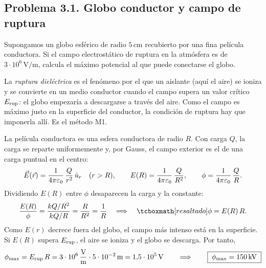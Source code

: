 \subsection{Problema 3.1. Globo conductor y campo de ruptura}\label{sem:globo}
\begin{problema}\label{prob:globo}
Supongamos un globo esférico de radio $5\,\mathrm{cm}$ recubierto por una fina película conductora. Si el campo electrostático de ruptura en la atmósfera
es de $3\cdot10^{6}\,\mathrm{V/m}$, calcula el máximo potencial al que puede conectarse el globo.
\end{problema}

\begin{resolucion}
 La \emph{ruptura dieléctrica} es el fenómeno por el que un aislante (aquí el aire) se ioniza y se convierte en un medio conductor cuando el
campo supera un valor crítico $E_{\mathrm{rup}}$: el globo empezaría a descargarse a través del aire. Como el campo es máximo justo en la superficie del conductor, la
condición de ruptura hay que imponerla allí. Es el método M1.

 La película conductora es una esfera conductora de radio $R$. Con carga $Q$, la carga se reparte
uniformemente y, por Gauss, el campo exterior es el de una carga puntual en el centro:
\[
  \vec{E}(\vec{r})=\frac{1}{4\pi\varepsilon_{0}}\,\frac{Q}{r^{2}}\,\hat{u}_{r}\quad(r>R),\qquad E(R)=\frac{1}{4\pi\varepsilon_{0}}\,\frac{Q}{R^{2}},\qquad
  \phi=\frac{1}{4\pi\varepsilon_{0}}\,\frac{Q}{R} .
\]
 Dividiendo $E(R)$ entre $\phi$ desaparecen la carga y la constante:
\[
  \frac{E(R)}{\phi}=\frac{\kc Q/R^{2}}{\kc Q/R}=\frac{R}{R^{2}}=\frac1R\quad\Longrightarrow\quad\resalta{\phi=E(R)\,R .}
\]
 Como $E(r)$ decrece fuera del globo, el campo más intenso está en la superficie. Si $E(R)$ supera $E_{\mathrm{rup}}$, el aire se
ioniza y el globo se descarga. Por tanto,
\[
  \phi_{\max}=E_{\mathrm{rup}}\,R=3\cdot10^{6}\,\frac{\mathrm{V}}{\mathrm{m}}\cdot5\cdot10^{-2}\,\mathrm{m}=1{,}5\cdot10^{5}\,\mathrm{V}
  \qquad\Longrightarrow\qquad\boxed{\;\phi_{\max}=150\,\mathrm{kV}\;}
\]
\end{resolucion}



